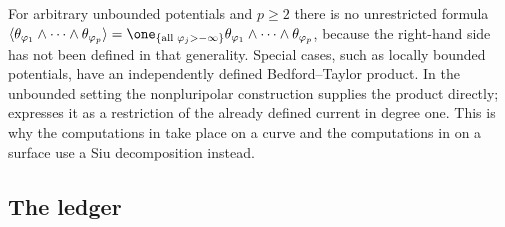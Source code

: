 \begin{remark}
\label{rem:ch51-npp-no-restriction}
For arbitrary unbounded potentials and $p\geq2$ there is no
unrestricted formula
$\langle\theta_{\varphi_1}\wedge\cdots\wedge\theta_{\varphi_p}\rangle
=\one_{\{\text{all }\varphi_j>-\infty\}}
\theta_{\varphi_1}\wedge\cdots\wedge\theta_{\varphi_p}$, because the
right-hand side has not been defined in that generality.  Special
cases, such as locally bounded potentials, have an independently defined
Bedford--Taylor product.  In the unbounded setting the nonpluripolar
construction supplies the product directly;
 expresses it as a restriction of the
already defined current in degree one.  This is why the
computations in  take place on a curve and the
computations in  on a surface use a Siu
decomposition instead.
\end{remark}

\subsection{The ledger}
\label{sec:ch51-npp-ledger}

